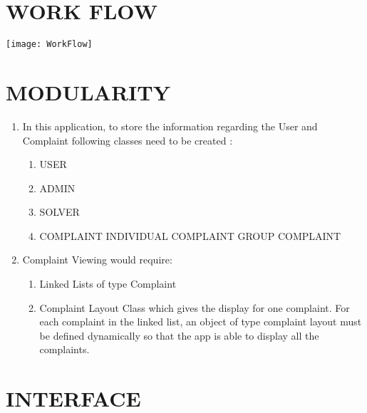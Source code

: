 \documentclass{article}
\begin{document}
\begin{itemize}
\begin{enumerate}
\section{WORK FLOW}
    \begin{minipage}{\linewidth}
	        
	        \texttt{[image: WorkFlow]}
            \end{minipage}
            \newline
\newpage
\section{MODULARITY}
\begin{enumerate}
    \item In this application, to store the information regarding the User and Complaint following classes need to be created :
\begin{enumerate}
    \item USER
    \item ADMIN
    \item SOLVER
    \item COMPLAINT
    \subitem INDIVIDUAL COMPLAINT
    \subitem GROUP COMPLAINT
    
    
    
\end{enumerate}
\item Complaint Viewing would require:
\begin{enumerate}
    \item Linked Lists of type Complaint
    \item Complaint Layout Class which gives the display for one complaint. For each complaint in the linked list, an object of type complaint layout must be defined dynamically so that the app is able to display all the complaints.
    
    
    
    
\end{enumerate}

\end{enumerate} 
\newpage
\section{INTERFACE}
\newline
\newline


\end{enumerate}
\end{itemize}
\end{document}
